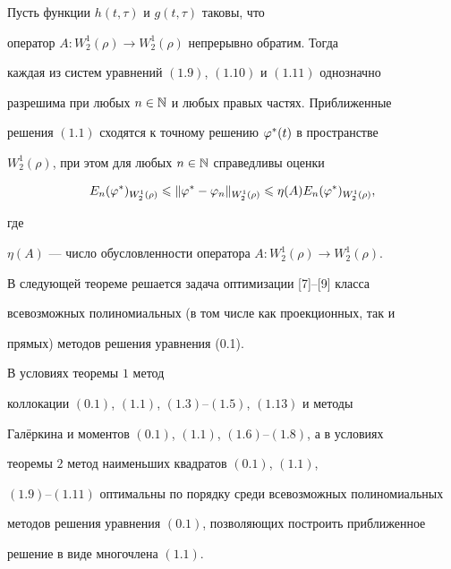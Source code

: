 \begin{thm}


Пусть функции $h(t,\tau)$ и $g(t,\tau)$ таковы, что 


оператор $A:W_2^1(\rho)\to W_2^1(\rho)$ непрерывно обратим. Тогда 


каждая из систем уравнений $(1.9)$, $(1.10)$ и $(1.11)$ однозначно 


разрешима при любых $n\in \Bbb N$ и любых правых частях. Приближенные 


решения $(1.1)$ сходятся к точному решению $\varphi^*(t)$ в пространстве


$W_2^1(\rho)$, при этом для любых $n\in\Bbb N$ справедливы оценки 


\begin{equation}


E_n(\vp^*)_{W_2^1(\rho)}\lea \|\vp^* - \vp_n\|_{W_2^1(\rho)}\lea


\eta(A)E_n(\vp^*)_{W_2^1(\rho)},


\end{equation}


где 


$\eta(A)$ --- число обусловленности оператора $A:W_2^1(\rho)\to W_2^1(\rho)$.


\end{thm}





В следующей теореме решается задача оптимизации [7]--[9] класса 


всевозможных полиномиальных (в том числе как проекционных, так и 


прямых) методов решения уравнения (0.1).





\begin{thm}


В условиях теоремы $1$ метод 


коллокации $(0.1)$, $(1.1)$, $(1.3)$--$(1.5)$, $(1.13)$ и методы 


Гал\"еркина и моментов $(0.1)$, $(1.1)$, $(1.6)$--$(1.8)$, а в условиях 


теоремы $2$ метод наименьших квадратов $(0.1)$, $(1.1)$,


$(1.9)$--$(1.11)$ оптимальны по порядку среди всевозможных полиномиальных 


методов решения уравнения $(0.1)$, позволяющих построить приближенное 


решение в виде многочлена $(1.1)$. 


\end{thm}









